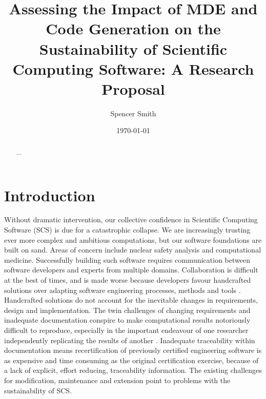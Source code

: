 \documentclass[12pt]{article}
\begin{document}
\title{Assessing the Impact of MDE and Code Generation on the Sustainability of
  Scientific Computing Software: A Research Proposal} 
\author{Spencer Smith}
\date{\today}
	
\maketitle

\begin{abstract}
  ...
\end{abstract}

\tableofcontents

\newpage

\section{Introduction} \label{SecIntroduction}

Without dramatic intervention, our collective confidence in Scientific Computing
Software (SCS) is due for a catastrophic collapse.  We are increasingly trusting
ever more complex and ambitious computations, but our software foundations are
built on sand. Areas of concern include nuclear safety analysis and
computational medicine. Successfully building such software requires
communication between software developers and experts from multiple
domains. Collaboration is difficult at the best of times, and is made worse
because developers favour handcrafted solutions over adapting software
engineering processes, methods and tools \citep{FaulkEtAl2009}. Handcrafted
solutions do not account for the inevitable changes in requirements, design and
implementation. The twin challenges of changing requirements and inadequate
documentation conspire to make computational results notoriously difficult to
reproduce, especially in the important endeavour of one researcher independently
replicating the results of another \citep{Smith2018}.  Inadequate traceability
within documentation means re­certification of previously certified engineering
software is as expensive and time consuming as the original certification
exercise, because of a lack of explicit, effort reducing, traceability
information.  The existing challenges for modification, maintenance and
extension point to problems with the sustainability of SCS.
\end{document}
